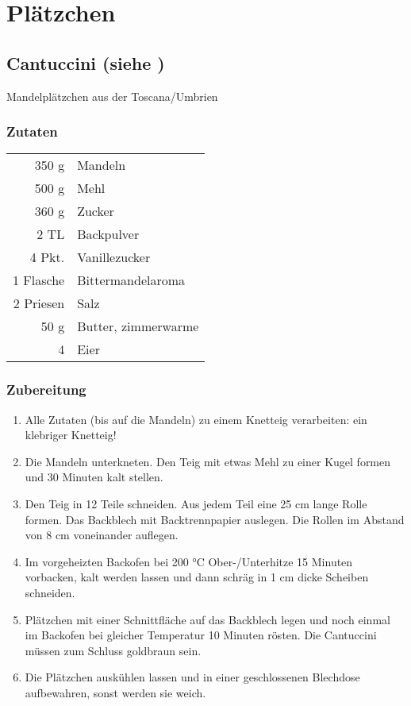 \chapter{Plätzchen}

\section[Cantuccini]{Cantuccini \textmd{(siehe \cite{ChefkochCantuccini})}}
Mandelplätzchen aus der Toscana/Umbrien
\subsection*{Zutaten}

\begin {tabular}{r l}
    350 g & Mandeln \\
    500 g & Mehl \\
    360 g & Zucker \\
    2 TL & Backpulver \\
    4 Pkt. & Vanillezucker \\
    1 Flasche & Bittermandelaroma \\
    2 Priesen & Salz \\
    50 g & Butter, zimmerwarme \\
    4 & Eier
\end{tabular}
\subsection*{Zubereitung}
\begin{enumerate}
    \item  Alle Zutaten (bis auf die Mandeln) zu einem Knetteig verarbeiten: ein klebriger Knetteig!
    \item  Die Mandeln unterkneten. Den Teig mit etwas Mehl zu einer Kugel formen und 30 Minuten kalt stellen.
    \item  Den Teig in 12 Teile schneiden. Aus jedem Teil eine 25 cm lange Rolle formen. Das Backblech mit Backtrennpapier auslegen. Die Rollen im
    Abstand von 8 cm voneinander auflegen.
    \item  Im vorgeheizten Backofen bei 200 °C Ober-/Unterhitze 15 Minuten vorbacken, kalt werden lassen und dann schräg in 1 cm dicke
    Scheiben schneiden.
    \item  Plätzchen mit einer Schnittfläche auf das Backblech legen und noch einmal im Backofen bei gleicher Temperatur 10 Minuten rösten. Die Cantuccini müssen zum Schluss
    goldbraun sein.
    \item  Die Plätzchen auskühlen lassen und in einer geschlossenen Blechdose aufbewahren, sonst werden sie weich. 
\end{enumerate}
